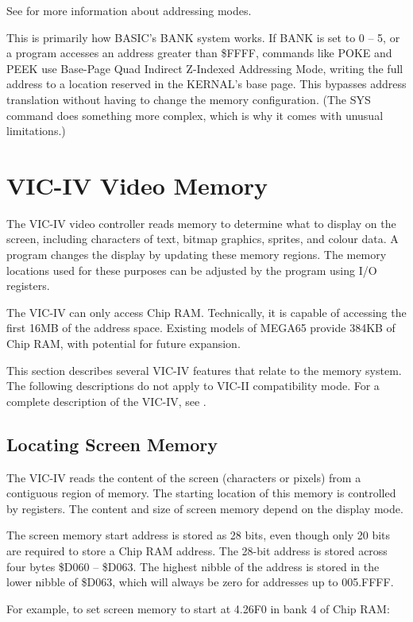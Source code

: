 See  for more information about addressing modes.

This is primarily how BASIC's BANK system works. If BANK is set to 0 -- 5, or
a program accesses an address greater than \$FFFF, commands like POKE and PEEK
use Base-Page Quad Indirect Z-Indexed Addressing Mode, writing the full
address to a location reserved in the KERNAL's base page. This bypasses
address translation without having to change the memory configuration. (The
SYS command does something more complex, which is why it comes with unusual
limitations.)


\newpage
\section{VIC-IV Video Memory}

The VIC-IV video controller reads memory to determine what to display
on the screen, including characters of text, bitmap graphics, sprites, and
colour data. A program changes the display by updating these memory regions.
The memory locations used for these purposes can be adjusted by the program using
I/O registers.

The VIC-IV can only access Chip RAM. Technically, it is capable of accessing
the first 16MB of the address space. Existing models of MEGA65 provide 384KB of
Chip RAM, with potential for future expansion.

This section describes several VIC-IV features that relate to the memory
system. The following descriptions do not apply to VIC-II compatibility mode.
For a complete description of the VIC-IV, see .

\subsection{Locating Screen Memory}

The VIC-IV reads the content of the screen (characters or pixels) from a
contiguous region of memory. The starting location of this memory is controlled
by registers. The content and size of screen memory depend on the display mode.

The screen memory start address is stored as 28 bits, even though only 20 bits
are required to store a Chip RAM address. The 28-bit address is stored across
four bytes \$D060 -- \$D063. The highest nibble of the address is stored in
the lower nibble of \$D063, which will always be zero for addresses up to 005.FFFF.

For example, to set screen memory to start at 4.26F0 in bank 4 of Chip RAM:

